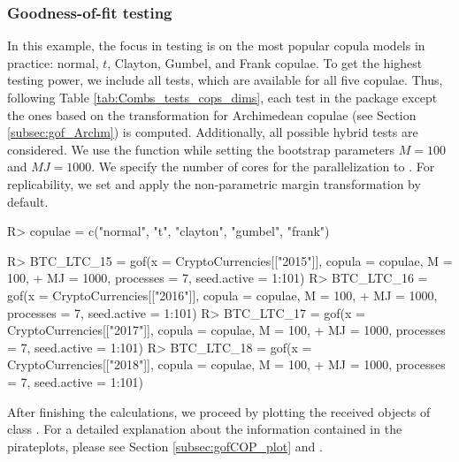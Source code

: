 \subsubsection{Goodness-of-fit testing}
\mycolor In this example, the focus in testing is on the most popular copula models in practice: normal, $t$, Clayton, Gumbel, and Frank copulae. To get the highest testing power, we include all tests, which are available for all five copulae. Thus, following Table \ref{tab:Combs_tests_cops_dims}, each test in the package except the ones based on the transformation for Archimedean copulae (see Section \ref{subsec:gof_Archm}) is computed. Additionally, all possible hybrid tests are considered. We use the function  while setting the bootstrap parameters $M = 100$ and $MJ = 1000$. We specify the number of cores for the parallelization to . For replicability, we set  and apply the non-parametric margin transformation by default.
\mycolor
\begin{example}
R> copulae = c("normal", "t", "clayton", "gumbel", "frank")

R> BTC_LTC_15 = gof(x = CryptoCurrencies[["2015"]], copula = copulae, M = 100, 
+                   MJ = 1000, processes = 7, seed.active = 1:101)
R> BTC_LTC_16 = gof(x = CryptoCurrencies[["2016"]], copula = copulae, M = 100, 
+                   MJ = 1000, processes = 7, seed.active = 1:101)
R> BTC_LTC_17 = gof(x = CryptoCurrencies[["2017"]], copula = copulae, M = 100, 
+                   MJ = 1000, processes = 7, seed.active = 1:101)
R> BTC_LTC_18 = gof(x = CryptoCurrencies[["2018"]], copula = copulae, M = 100, 
+                   MJ = 1000, processes = 7, seed.active = 1:101)
\end{example}
\bk
After finishing the calculations, we proceed by plotting the received objects of class . For a detailed explanation about the information contained in the  pirateplots, please see Section \ref{subsec:gofCOP_plot} and \citet{phillips2017yarrr}.

